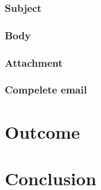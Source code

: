 \documentclass{article}
\begin{document}
\subsubsection{Subject}
\label{subsub:subject}

\subsubsection{Body}
\label{subsub:body}

\subsubsection{Attachment}
\label{subsub:attachment}

\subsubsection{Compelete email}
\label{subsub:complete_email}


\section{Outcome} %
\label{sec:outcome}



\section{Conclusion} %
\label{sec:conclusion}


\end{document}
